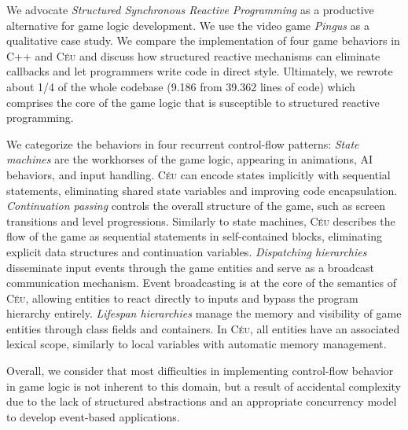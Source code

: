 \documentclass[10pt, conference, compsocconf]{IEEEtran}
\newcommand{\CEU}{\textsc{C\'{e}u}\xspace}
\begin{document}
We advocate \emph{Structured Synchronous Reactive Programming} as a productive
alternative for game logic development.
%
We use the video game \emph{Pingus} as a qualitative case study.
We compare the implementation of four game behaviors in C++ and \CEU and
discuss how structured reactive mechanisms can eliminate callbacks and let
programmers write code in direct style.
%
Ultimately, we rewrote about 1/4 of the whole codebase (9.186 from 39.362 lines
of code) which comprises the core of the game logic that is susceptible to
structured reactive programming.

We categorize the behaviors in four recurrent control-flow patterns:
%
\emph{State machines} are the workhorses of the game logic, appearing in
animations, AI behaviors, and input handling.
\CEU can encode states implicitly with sequential statements,
eliminating shared state variables and improving code encapsulation.
%
\emph{Continuation passing} controls the overall structure of the game, such as
screen transitions and level progressions.
Similarly to state machines, \CEU describes the flow of the game as sequential
statements in self-contained blocks, eliminating explicit data structures and
continuation variables.
%
\emph{Dispatching hierarchies} disseminate input events through the game
entities and serve as a broadcast communication mechanism.
Event broadcasting is at the core of the semantics of \CEU, allowing entities
to react directly to inputs and bypass the program hierarchy entirely.
%
\emph{Lifespan hierarchies} manage the memory and visibility of game entities
through class fields and containers.
In \CEU, all entities have an associated lexical scope, similarly to local
variables with automatic memory management.

Overall, we consider that most difficulties in implementing control-flow
behavior in game logic is not inherent to this domain, but a result of
accidental complexity due to the lack of structured abstractions and an
appropriate concurrency model to develop event-based applications.

\end{document}
